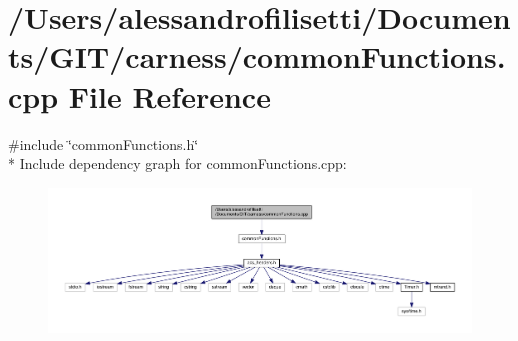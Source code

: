 \hypertarget{a00057}{\section{/\+Users/alessandrofilisetti/\+Documents/\+G\+I\+T/carness/common\+Functions.cpp File Reference}
\label{a00057}
}
{\ttfamily \#include \char`\"{}common\+Functions.\+h\char`\"{}}\\*
Include dependency graph for common\+Functions.\+cpp\+:\nopagebreak
\begin{figure}[H]
\begin{center}
\leavevmode
\includegraphics[width=350pt]{a00173}
\end{center}
\end{figure}
